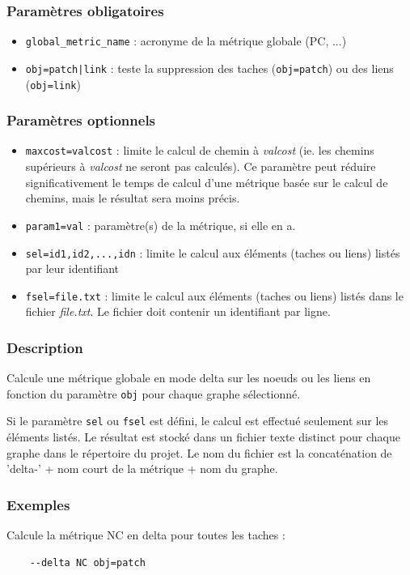 \documentclass[a4paper,10pt]{report}
\begin{document}
\subsubsection{Paramètres obligatoires}
\begin{itemize}
	\item \verb|global_metric_name| : acronyme de la métrique globale (PC, ...)
	\item \verb+obj=patch|link+ : teste la suppression des taches (\verb+obj=patch+) ou des liens (\verb+obj=link+)
\end{itemize}

\subsubsection{Paramètres optionnels}
\begin{itemize}
	\item \verb|maxcost=valcost| : limite le calcul de chemin à \textit{valcost} (ie. les chemins supérieurs à \textit{valcost} ne seront pas calculés). Ce paramètre peut réduire significativement le temps de calcul d'une métrique basée sur le calcul de chemins, mais le résultat sera moins précis.
	\item \verb|param1=val| : paramètre(s) de la métrique, si elle en a.
	\item \verb|sel=id1,id2,...,idn| : limite le calcul aux éléments (taches ou liens) listés par leur identifiant
	\item \verb|fsel=file.txt| : limite le calcul aux éléments (taches ou liens) listés dans le fichier \textit{file.txt}. Le fichier doit contenir un identifiant par ligne.
\end{itemize}

\subsubsection{Description}
Calcule une métrique globale en mode delta sur les noeuds ou les liens en fonction du paramètre \verb|obj| pour chaque graphe sélectionné.

Si le paramètre \verb|sel| ou \verb|fsel| est défini, le calcul est effectué seulement sur les éléments listés.
Le résultat est stocké dans un fichier texte distinct pour chaque graphe dans le répertoire du projet.
Le nom du fichier est la concaténation de 'delta-' + nom court de la métrique + nom du graphe.

\subsubsection{Exemples}
Calcule la métrique NC en delta pour toutes les taches :
\begin{Verbatim}
	--delta NC obj=patch
\end{Verbatim}
\end{document}
